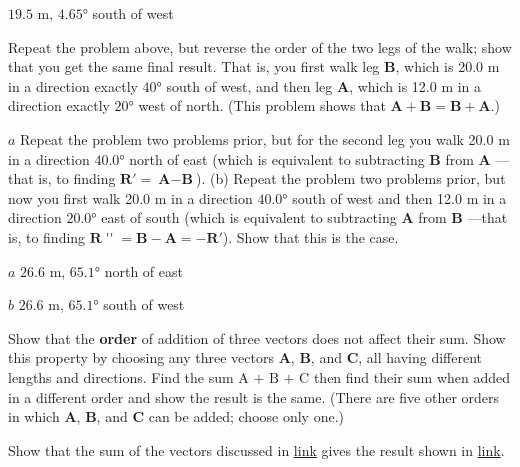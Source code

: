\documentclass[
]{book}
\newenvironment{problems-exercises}{}{}
\begin{document}
\begin{problems-exercises}
\leavevmode\hypertarget{fs-id1165298995751}{}%
\({\text{19}\text{.}\text{5\ m}}{}\), \({4\text{.}\text{65°}}{}\) south of
west

\hypertarget{fs-id1165298849088}{}
\leavevmode\hypertarget{fs-id1165296252134}{}%
Repeat the problem above, but reverse the order of the two legs of the
walk; show that you get the same final result. That is, you first walk
leg \(\mathbf{B}{}\), which is 20.0 m in a direction exactly
\(\text{40°}{}\) south of west, and then leg \(\mathbf{A}{}\), which is 12.0
m in a direction exactly \(\text{20°}{}\) west of north. (This problem
shows that \({{\mathbf{A} + \mathbf{B}} = {\mathbf{B} + \mathbf{A}}}{}\).)

\hypertarget{fs-id1165298560552}{}
\leavevmode\hypertarget{fs-id1165296243866}{}%
\(a\) Repeat the problem two problems prior, but for the second leg you
walk 20.0 m in a direction \(\text{40.0°}{}\) north of east (which is
equivalent to subtracting \(\textbf{B}{}\) from \(\mathbf{A}{}\) ---that is,
to finding \({{\textbf{R}\prime} = {\textbf{A} - \textbf{B}}}{}\)). (b)
Repeat the problem two problems prior, but now you first walk 20.0 m in
a direction \(\text{40.0°}{}\) south of west and then 12.0 m in a
direction \(\text{20.0°}{}\) east of south (which is equivalent to
subtracting \(\textbf{A}{}\) from \(\textbf{B}{}\) ---that is, to finding
\({\textbf{R}\operatorname{\prime\prime} = \textbf{B} - \textbf{A} = - \textbf{R}\prime}{}\)).
Show that this is the case.

\leavevmode\hypertarget{fs-id1165296252966}{}%
\(a\) \({\text{26}\text{.}\text{6\ m}}{}\),
\({\text{65}\text{.}\text{1°}}{}\) north of east

\(b\) \({\text{26}\text{.}\text{6\ m}}{}\),
\({\text{65}\text{.}\text{1°}}{}\) south of west

\hypertarget{fs-id1165296576869}{}
\leavevmode\hypertarget{fs-id1165296576870}{}%
Show that the \textbf{order} of addition of three vectors does not affect
their sum. Show this property by choosing any three vectors
\(\mathbf{A}{}\), \(\mathbf{B}{}\), and \(\mathbf{C}{}\), all having different
lengths and directions. Find the sum \(\text{A~+~B~+~C}{}\) then find
their sum when added in a different order and show the result is the
same. (There are five other orders in which \(\mathbf{A}{}\),
\(\mathbf{B}{}\), and \(\mathbf{C}{}\) can be added; choose only one.)

\hypertarget{fs-id1165298800490}{}
\leavevmode\hypertarget{fs-id1165298879927}{}%
Show that the sum of the vectors discussed in
\protect\hyperlink{fs-id1165296679497}{link} gives the result
shown in \protect\hyperlink{import-auto-id1165296298190}{link}.


\end{problems-exercises}
\end{document}
